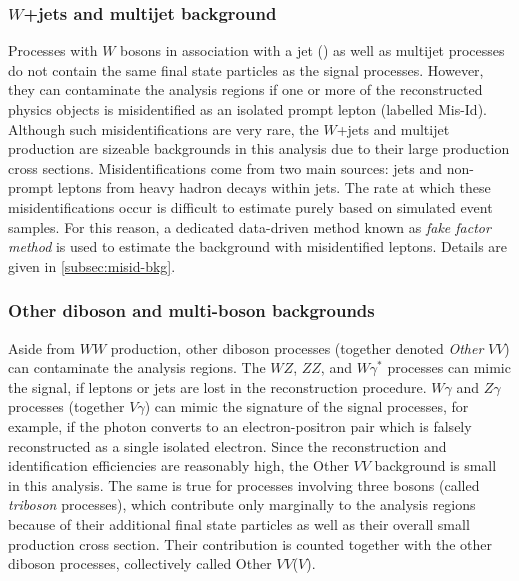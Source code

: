 \subsubsection{$W$+jets and multijet background}
Processes with $W$ bosons in association with a jet (\Wjets) as well as multijet processes do not contain the same final state particles as the signal processes. However, they can contaminate the analysis regions if one or more of the reconstructed physics objects is misidentified as an isolated prompt lepton (labelled Mis-Id). 
Although such misidentifications are very rare, the $W$+jets and multijet production are sizeable backgrounds in this analysis due to their large production cross sections.
Misidentifications come from two main sources: jets and non-prompt leptons from heavy hadron decays within jets.
The rate at which these misidentifications occur is difficult to estimate purely based on simulated event samples. For this reason, a dedicated data-driven method known as \emph{fake factor method} is used to estimate the background with misidentified leptons. Details are given in \cref{subsec:misid-bkg}.


\subsubsection{Other diboson and multi-boson backgrounds}
Aside from $WW$ production, other diboson processes (together denoted \emph{Other} $VV$) can contaminate the analysis regions. 
The $WZ$, $ZZ$, and $W\gamma^*$ processes can mimic the signal, if leptons or jets are lost in the reconstruction procedure. 
$W\gamma$ and $Z\gamma$ processes (together $V\gamma$) can mimic the signature of the signal processes, for example, if the photon converts to an electron-positron pair which is falsely reconstructed as a single isolated electron. 
Since the reconstruction and identification efficiencies are reasonably high, the Other $VV$ background is small in this analysis.
The same is true for processes involving three bosons (called \emph{triboson} processes), which contribute only marginally to the analysis regions because of their additional final state particles as well as their overall small production cross section. Their contribution is counted together with the other diboson processes, collectively called Other $VV$($V$). 

